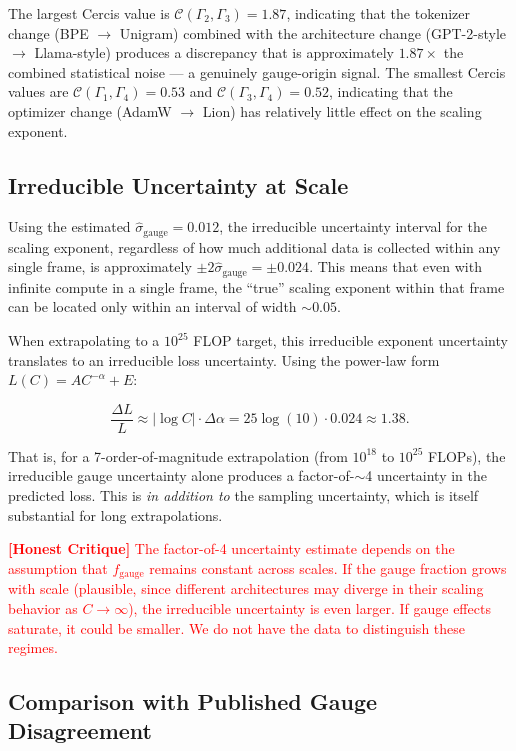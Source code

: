 \documentclass[12pt,a4paper]{article}
\theoremstyle{remark}
\newcommand{\honestcrit}[1]{\textcolor{red}{\textbf{[Honest Critique]} #1}}
\newcommand{\cercis}{\mathcal{C}}
\newcommand{\Loss}{L}
\begin{document}
The largest Cercis value is $\cercis(\Gamma_2, \Gamma_3) = 1.87$, indicating that the tokenizer change (BPE $\to$ Unigram) combined with the architecture change (GPT-2-style $\to$ Llama-style) produces a discrepancy that is approximately $1.87\times$ the combined statistical noise — a genuinely gauge-origin signal. The smallest Cercis values are $\cercis(\Gamma_1, \Gamma_4) = 0.53$ and $\cercis(\Gamma_3, \Gamma_4) = 0.52$, indicating that the optimizer change (AdamW $\to$ Lion) has relatively little effect on the scaling exponent.

\subsection{Irreducible Uncertainty at Scale}

Using the estimated $\hat{\sigma}_{\text{gauge}} = 0.012$, the irreducible uncertainty interval for the scaling exponent, regardless of how much additional data is collected within any single frame, is approximately $\pm 2\hat{\sigma}_{\text{gauge}} = \pm 0.024$. This means that even with infinite compute in a single frame, the ``true'' scaling exponent within that frame can be located only within an interval of width $\sim 0.05$.

When extrapolating to a $10^{25}$ FLOP target, this irreducible exponent uncertainty translates to an irreducible loss uncertainty. Using the power-law form $\Loss(C) = A C^{-\alpha} + E$:

\begin{equation}
\frac{\Delta \Loss}{\Loss} \approx |\log C| \cdot \Delta \alpha = 25 \log(10) \cdot 0.024 \approx 1.38.
\end{equation}

That is, for a 7-order-of-magnitude extrapolation (from $10^{18}$ to $10^{25}$ FLOPs), the irreducible gauge uncertainty alone produces a factor-of-$\sim$4 uncertainty in the predicted loss. This is \emph{in addition to} the sampling uncertainty, which is itself substantial for long extrapolations.

\honestcrit{The factor-of-4 uncertainty estimate depends on the assumption that $f_{\text{gauge}}$ remains constant across scales. If the gauge fraction grows with scale (plausible, since different architectures may diverge in their scaling behavior as $C \to \infty$), the irreducible uncertainty is even larger. If gauge effects saturate, it could be smaller. We do not have the data to distinguish these regimes.}

\subsection{Comparison with Published Gauge Disagreement}
\end{document}
